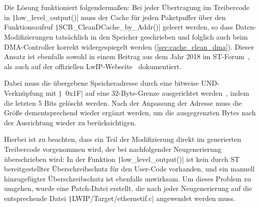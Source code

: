 Die Lösung funktioniert folgendermaßen: Bei jeder Übertragung im Treibercode in
\texttt|low_level_output()| muss der Cache für jeden Paketpuffer über
den Funktionsaufruf \texttt|SCB_CleanDCache_by_Addr()| geleert werden,
so dass Daten-Modifizierungen tatsächlich in den Speicher geschrieben und
folglich auch beim DMA-Controller korrekt widergespiegelt werden
(\ref{sec:cache_clean_dma}). Dieser Ansatz ist ebenfalls sowohl in einem Beitrag
aus dem Jahr 2018 im ST-Forum~\cite{ST_Forum_Post_2018}, als auch auf der
offiziellen LwIP-Webseite~\cite{lwip_pitfalls} dokumentiert.

Dabei muss die übergebene Speicheradresse durch eine bitweise UND-Verknüpfung
mit \texttt|~0x1F| auf eine 32-Byte-Grenze ausgerichtet
werden~\cite{CMSIS_Core_CacheFunctions}, indem die letzten 5 Bits gelöscht
werden. Nach der Anpassung der Adresse muss die Größe dementsprechend wieder
ergänzt werden, um die ausgegrenzten Bytes nach der Ausrichtung wieder zu
berücksichtigen.

Hierbei ist zu beachten, dass ein Teil der Modifizierung direkt im generierten
Treibercode vorgenommen wird, der bei nachfolgender Neugenerierung überschrieben
wird: In der Funktion \texttt|low_level_output()| ist kein durch ST
bereitgestellter Überschreibschutz für den User-Code vorhanden, und ein manuell
hinzugefügter Überschreibschutz ist ebenfalls unwirksam. Um dieses Problem zu
umgehen, wurde eine Patch-Datei erstellt, die nach jeder Neugenerierung auf die
entsprechende Datei \texttt|LWIP/Target/ethernetif.c| angewendet
werden muss.
